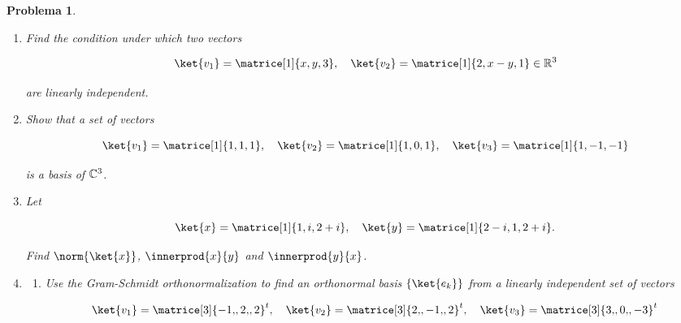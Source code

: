 \documentclass[12pt]{article}
\theoremstyle{break}
\newtheorem{exercise}{Problema}
\theoremstyle{nonumberbreak}
\begin{document}
    \begin{exercise}
        \begin{enumerate}[label = (\alph*)]
            \item Find the condition under which two vectors
            
            \begin{equation*}
                \ket{v_{1}} = \matrice[1]{x, y, 3}, \quad \ket{v_{2}} = \matrice[1]{2, x - y, 1} \in \vecspace{R}[3]
            \end{equation*}

            are linearly independent.

            \item Show that a set of vectors
            
            \begin{equation*}
                \ket{v_{1}} = \matrice[1]{1, 1, 1},\quad \ket{v_{2}} = \matrice[1]{1, 0, 1}, \quad \ket{v_{3}} = \matrice[1]{1, -1, -1}
            \end{equation*}

            is a basis of \(\vecspace{C}[3]\).

            \item Let
            
            \begin{equation*}
                \ket{x} = \matrice[1]{1, i, 2 + i}, \quad
                \ket{y} = \matrice[1]{2 - i, 1, 2 + i}.
            \end{equation*}

            Find \(\norm{\ket{x}}\), \(\innerprod{x}{y}\) and \(\innerprod{y}{x}\).

            \item
            
            \begin{enumerate}[label = \arabic*.]
                \item Use the Gram-Schmidt orthonormalization to find an orthonormal basis \(\left\lbrace \ket{e_{k}}\right\rbrace\) from a linearly independent set of vectors
                
                \begin{equation*}
                    \ket{v_{1}} = \matrice[3]{-1{,}, 2{,}, 2}^{t},
                    \quad
                    \ket{v_{2}} = \matrice[3]{2{,}, -1{,}, 2}^{t},
                    \quad
                    \ket{v_{3}} = \matrice[3]{3{,}, 0{,}, -3}^{t}
                \end{equation*}


\end{enumerate}
\end{enumerate}
\end{exercise}
\end{document}
